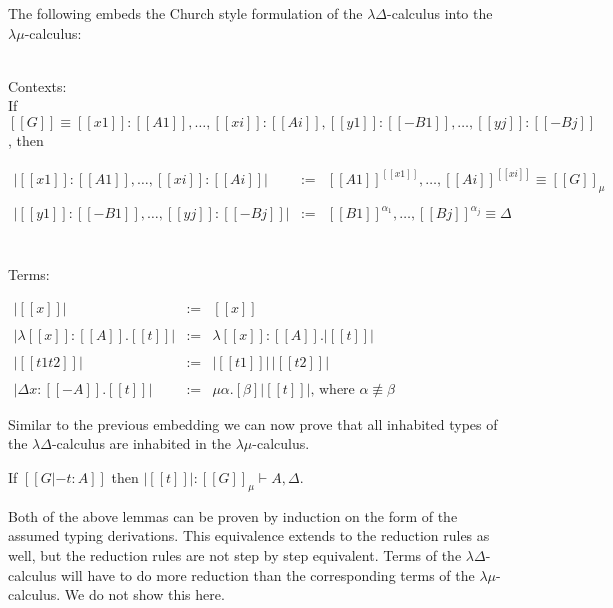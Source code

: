 \begin{definition}
  \label{def:embed_lamd_lamu}
  The following embeds the Church style formulation of the $\lambda\Delta$-calculus into the
  $\lambda\mu$-calculus:
  
  \ \\
  Contexts:\\  
  If $[[G]] \equiv [[x1]] : [[A1]], \ldots, [[xi]] : [[Ai]], [[y1]] : [[{-B1}]], \ldots, [[yj]] : [[{-Bj}]]$, then
  \begin{center}
    \begin{math}
      \begin{array}{lll}
        |[[x1]] : [[A1]], \ldots, [[xi]] : [[Ai]]| & := & [[A1]]^{[[x1]]}, \ldots, [[Ai]]^{[[xi]]} \equiv [[G]]_\mu\\
        &\\
        |[[y1]] : [[{-B1}]], \ldots, [[yj]] : [[{-Bj}]]| & := & [[B1]]^{\alpha_1},\ldots,[[Bj]]^{\alpha_j} \equiv \Delta\\
      \end{array}
    \end{math}
  \end{center}
  
  \ \\
  Terms:
  \begin{center}
    \begin{math}
      \begin{array}{lll}
        |[[x]]|  & := & [[x]]\\
        &\\
        |\lambda [[x]]:[[A]].[[t]]| & := & \lambda [[x]]:[[A]].|[[t]]|\\
        &\\
        |[[t1 t2]]|  & := & |[[t1]]|\,|[[t2]]|\\
        &\\
        |\Delta x:[[{-A}]].[[t]]| & := & \mu \alpha.[ \beta ]|[[t]]|
          \text{, where } \alpha \not \equiv \beta
      \end{array}
    \end{math}
  \end{center}
\end{definition}
\noindent
Similar to the previous embedding we can now prove that all inhabited
types of the $\lambda\Delta$-calculus are inhabited in the
$\lambda\mu$-calculus.
\begin{lemma}
  \label{lemma:lamd_is_lamu}
  If $[[G |- t : A]]$ then $|[[t]]| : [[G]]_\mu \vdash A,\Delta$.
\end{lemma}
\noindent 
Both of the above lemmas can be proven by induction on the form of the
assumed typing derivations.  This equivalence extends to the reduction
rules as well, but the reduction rules are not step by step
equivalent. Terms of the $\lambda\Delta$-calculus will have
to do more reduction than the corresponding terms of the
$\lambda\mu$-calculus.  We do not show this here.
